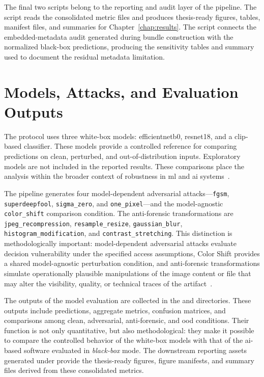 The final two scripts belong to the reporting and audit layer of the pipeline.
The script
 reads
the consolidated metric files and produces thesis-ready figures, tables,
manifest files, and summaries for Chapter~\ref{chap:results}. The script
connects the embedded-metadata audit generated during bundle construction with
the normalized black-box predictions, producing the sensitivity tables and
summary used to document the residual metadata limitation.


\section{Models, Attacks, and Evaluation Outputs}
\label{app:models-attacks-evaluation-outputs}

The protocol uses three white-box models: \gls{efficientnetb0}, \gls{resnet18},
and a \gls{clip}-based classifier. These models provide a controlled reference
for comparing predictions on clean, perturbed, and out-of-distribution inputs.
Exploratory models are not included in the reported results.
These comparisons place the analysis within the
broader context of robustness in \gls{ml} and \gls{ai}
systems~\cite{bishop2006pattern,biggio2018wild,radford2021learning}.

The pipeline generates four model-dependent adversarial attacks---\texttt{fgsm},
\texttt{superdeepfool}, \texttt{sigma\_zero}, and \texttt{one\_pixel}---and
the model-agnostic \texttt{color\_shift} comparison condition. The
anti-forensic transformations are
\texttt{jpeg\_recompression}, \texttt{resample\_resize},
\texttt{gaussian\_blur}, \texttt{histogram\_modification}, and
\texttt{contrast\_stretching}. This distinction is methodologically important:
model-dependent adversarial attacks evaluate decision vulnerability under the
specified access assumptions, Color Shift provides a shared model-agnostic
perturbation condition, and anti-forensic transformations simulate
operationally plausible manipulations of the image content or file that may
alter the visibility, quality, or technical traces of the
artifact~\cite{stamm2010anti,nowroozi2021survey,croce2020robustbench}.

The outputs of the model evaluation are collected in the
 and 
directories. These outputs include predictions, aggregate metrics, confusion
matrices, and comparisons among clean, adversarial, anti-forensic, and
\gls{ood} conditions. Their function is not only quantitative, but also
methodological: they make it possible to compare the controlled behavior of the
white-box models with that of the \gls{ai}-based software evaluated in
\textit{black-box} mode. The downstream reporting assets generated under
 provide the thesis-ready figures,
figure manifests, and summary files derived from these consolidated metrics.


